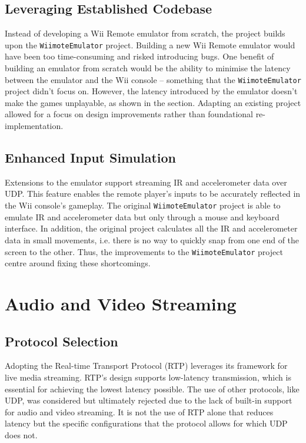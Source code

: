 \subsection{Leveraging Established Codebase}
Instead of developing a Wii Remote emulator from scratch, the project builds upon the \texttt{WiimoteEmulator} project. Building a new Wii Remote emulator would have been too time-consuming and risked introducing bugs. One benefit of building an emulator from scratch would be the ability to minimise the latency between the emulator and the Wii console -- something that the \texttt{WiimoteEmulator} project didn't focus on. However, the latency introduced by the emulator doesn't make the games unplayable, as shown in the  section. Adapting an existing project allowed for a focus on design improvements rather than foundational re-implementation.

\subsection{Enhanced Input Simulation}
Extensions to the emulator support streaming IR and accelerometer data over UDP. This feature enables the remote player’s inputs to be accurately reflected in the Wii console’s gameplay. The original \texttt{WiimoteEmulator} project is able to emulate IR and accelerometer data but only through a mouse and keyboard interface. In addition, the original project calculates all the IR and accelerometer data in small movements, i.e. there is no way to quickly snap from one end of the screen to the other. Thus, the improvements to the \texttt{WiimoteEmulator} project centre around fixing these shortcomings.

\section{Audio and Video Streaming}

\subsection{Protocol Selection}
Adopting the Real-time Transport Protocol (RTP) leverages its framework for live
media streaming. RTP’s design supports low-latency transmission, which is
essential for achieving the lowest latency possible. The use of other protocols, like
UDP, was considered but ultimately rejected due to the lack of built-in support for
audio and video streaming. It is not the use of RTP alone that reduces latency but the
specific configurations that the protocol allows for which UDP does not.

